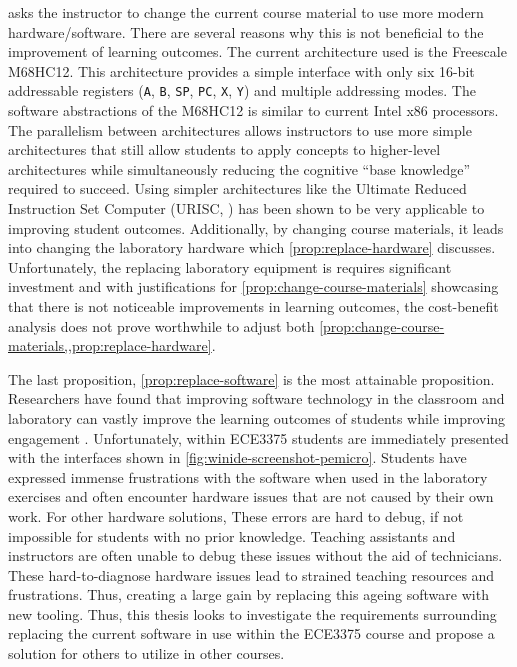  asks the instructor to change the current course material to use more modern hardware/software. There are several reasons why this is not beneficial to the improvement of learning outcomes. The current architecture used is the Freescale M68HC12. This architecture provides a simple interface with only six 16-bit addressable registers (\verb|A|, \verb|B|, \verb|SP|, \verb|PC|, \verb|X|, \verb|Y|) and multiple addressing modes\cite{hc12Manual2006}. The software abstractions of the M68HC12 is similar to current Intel\textregistered{} x86 processors\cite{intel2017}. The parallelism between architectures allows instructors to use more simple architectures that still allow students to apply concepts to higher-level architectures while simultaneously reducing the cognitive ``base knowledge'' required to succeed. Using simpler architectures like the Ultimate Reduced Instruction Set Computer (URISC, \cite{mavaddat1988}) has been shown to be very applicable to improving student outcomes\cite{Nakamura2013, McLoughlin2010, mavaddat1988}. Additionally, by changing course materials, it leads into changing the laboratory hardware which \cref{prop:replace-hardware} discusses. Unfortunately, the replacing laboratory equipment is requires significant investment and with justifications for \cref{prop:change-course-materials} showcasing that there is not noticeable improvements in learning outcomes, the cost-benefit analysis does not prove worthwhile to adjust both \cref{prop:change-course-materials,,prop:replace-hardware}.

The last proposition, \cref{prop:replace-software} is the most attainable proposition. Researchers have found that improving software technology in the classroom and laboratory can vastly improve the learning outcomes of students while improving engagement \cite{Ackovska2014, Stolikj2011, Ristov2011, Ristov2014, Nikolic2009, Skillen2011, Tappan2009, Djordjevic2005, cec2016}. Unfortunately, within ECE3375 students are immediately presented with the interfaces shown in \cref{fig:winide-screenshot-pemicro}. Students have expressed immense frustrations with the software when used in the laboratory exercises and often encounter hardware issues that are not caused by their own work\cite{evals:ece3375-2013, evals:ece3375-2014}. For other hardware solutions,  These errors are hard to debug, if not impossible for students with no prior knowledge. Teaching assistants and instructors are often unable to debug these issues without the aid of technicians. These hard-to-diagnose hardware issues lead to strained teaching resources and frustrations. Thus, creating a large gain by replacing this ageing software with new tooling. Thus, this thesis looks to investigate the requirements surrounding replacing the current software in use within the ECE3375 course and propose a solution for others to utilize in other courses. 

